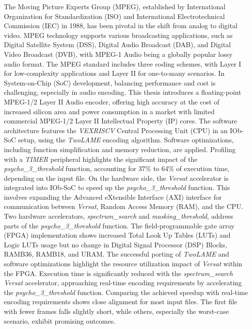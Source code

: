 The Moving Picture Experts Group (MPEG), established by International Organization for Standardization (ISO) and International Electrotechnical Commission (IEC) in 1988, has been pivotal in the shift from analog to digital video. MPEG technology supports various broadcasting applications, such as Digital Satellite System (DSS), Digital Audio Broadcast (DAB), and Digital Video Broadcast (DVB), with MPEG-1 Audio being a globally popular lossy audio format. The MPEG standard includes three coding schemes, with Layer I for low-complexity applications and Layer II for one-to-many scenarios.
In System-on-Chip (SoC) development, balancing performance and cost is challenging, especially in audio encoding. This thesis introduces a floating-point MPEG-1/2 Layer II Audio encoder, offering high accuracy at the cost of increased silicon area and power consumption in a market with limited commercial MPEG-1/2 Layer II Intellectual Property (IP) cores.
The software architecture features the \textit{VEXRISCV} Central Processing Unit (CPU) in an IOb-SoC setup, using the \textit{TwoLAME} encoding algorithm. Software optimizations, including function simplification and memory reduction, are applied. Profiling with a \textit{TIMER} peripheral highlights the significant impact of the \textit{psycho\_3\_threshold} function, accounting for 37\% to 64\% of execution time, depending on the input file.
On the hardware side, the \textit{Versat} accelerator is integrated into IOb-SoC to speed up the \textit{psycho\_3\_threshold} function. This involves expanding the Advanced eXtensible Interface (AXI) interface for communication between \textit{Versat}, Random Access Memory (RAM), and the CPU. Two hardware accelerators, \textit{spectrum\_search} and \textit{masking\_threshold}, address parts of the \textit{psycho\_3\_threshold} function. The field-programmable gate array (FPGA) implementation shows increased Total Look Up Tables (LUTs) and Logic LUTs usage but no change in Digital Signal Processor (DSP) Blocks, RAMB36, RAMB18, and URAM.
The successful porting of \textit{TwoLAME} and software optimizations highlight the resource utilization impact of \textit{Versat} within the FPGA. Execution time is significantly reduced with the \textit{spectrum\_search} \textit{Versat} accelerator, approaching real-time encoding requirements by accelerating the \textit{psycho\_3\_threshold} function.
Comparing the achieved speedup with real-time encoding requirements shows close alignment for most input files. The first file with fewer frames falls slightly short, while others, especially the worst-case scenario, exhibit promising outcomes.

